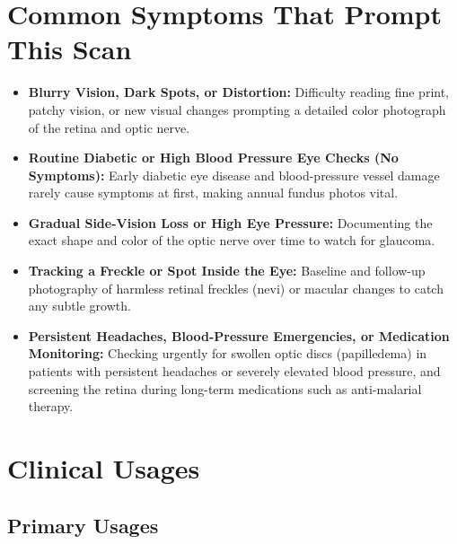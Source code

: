 \section{Common Symptoms That Prompt This Scan}
\begin{itemize}
    \item \textbf{Blurry Vision, Dark Spots, or Distortion:} Difficulty reading fine print, patchy vision, or new visual changes prompting a detailed color photograph of the retina and optic nerve.
    \item \textbf{Routine Diabetic or High Blood Pressure Eye Checks (No Symptoms):} Early diabetic eye disease and blood-pressure vessel damage rarely cause symptoms at first, making annual fundus photos vital.
    \item \textbf{Gradual Side-Vision Loss or High Eye Pressure:} Documenting the exact shape and color of the optic nerve over time to watch for glaucoma.
    \item \textbf{Tracking a Freckle or Spot Inside the Eye:} Baseline and follow-up photography of harmless retinal freckles (nevi) or macular changes to catch any subtle growth.
    \item \textbf{Persistent Headaches, Blood-Pressure Emergencies, or Medication Monitoring:} Checking urgently for swollen optic discs (papilledema) in patients with persistent headaches or severely elevated blood pressure, and screening the retina during long-term medications such as anti-malarial therapy.
\end{itemize}

\section{Clinical Usages}

\subsection{Primary Usages}

